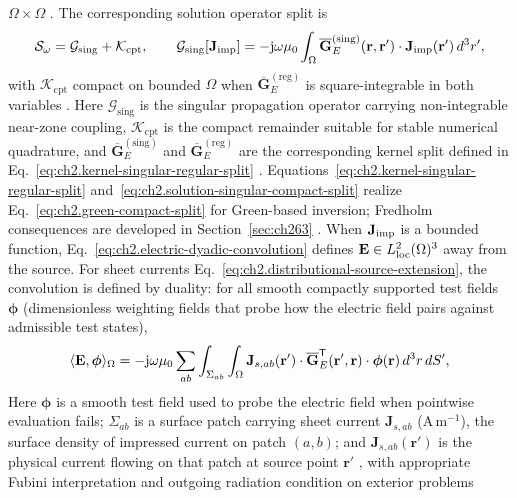 \(\Omega\times\Omega\) \cite{stratton1941}. The corresponding
solution operator split is
\begin{equation}
\label{eq:ch2.solution-singular-compact-split}
\mathcal{S}_\omega
=
\mathcal{G}_{\mathrm{sing}}+\mathcal{K}_{\mathrm{cpt}},
\qquad
\mathcal{G}_{\mathrm{sing}}[\mathbf{J}_{\mathrm{imp}}]
=
-\mathrm{j}\omega\mu_0\int_{\Omega}
\overline{\mathbf{G}}_{E}^{\mathrm{(sing)}}(\mathbf{r},\mathbf{r}')\cdot\mathbf{J}_{\mathrm{imp}}(\mathbf{r}')\,d^{3}r',
\end{equation}
with \(\mathcal{K}_{\mathrm{cpt}}\) compact on bounded \(\Omega\) when
\(\overline{\mathbf{G}}_{E}^{\mathrm{(reg)}}\) is square-integrable in both variables
\cite{stratton1941}. Here $\mathcal{G}_{\mathrm{sing}}$ is the singular propagation
operator carrying non-integrable near-zone coupling, $\mathcal{K}_{\mathrm{cpt}}$ is the
compact remainder suitable for stable numerical quadrature, and
$\overline{\mathbf{G}}_{E}^{\mathrm{(sing)}}$ and $\overline{\mathbf{G}}_{E}^{\mathrm{(reg)}}$
are the corresponding kernel split defined in Eq.~\eqref{eq:ch2.kernel-singular-regular-split}
\cite{harrington2001}. Equations~\eqref{eq:ch2.kernel-singular-regular-split}
and~\eqref{eq:ch2.solution-singular-compact-split} realize
Eq.~\eqref{eq:ch2.green-compact-split} for Green-based inversion; Fredholm consequences
are developed in Section~\ref{sec:ch263} \cite{harrington2001}.
When \(\mathbf{J}_{\mathrm{imp}}\) is a bounded function, Eq.~\eqref{eq:ch2.electric-dyadic-convolution}
defines \(\mathbf{E}\in L^{2}_{\mathrm{loc}}(\Omega)^{3}\) away from the source. For sheet
currents Eq.~\eqref{eq:ch2.distributional-source-extension}, the convolution is defined
by duality: for all smooth compactly supported test fields \(\boldsymbol{\phi}\) (dimensionless
weighting fields that probe how the electric field pairs against admissible test states),
\begin{equation}
\label{eq:ch2.distributional-dyadic-pairing}
\langle\mathbf{E},\boldsymbol{\phi}\rangle_{\Omega}
=
-\mathrm{j}\omega\mu_0
\sum_{ab}\int_{\Sigma_{ab}}\int_{\Omega}
\mathbf{J}_{s,ab}(\mathbf{r}')
\cdot\overline{\mathbf{G}}_{E}^{\mathsf{T}}(\mathbf{r}',\mathbf{r})\cdot\boldsymbol{\phi}(\mathbf{r})\,d^{3}r\,dS',
\end{equation}
Here $\boldsymbol{\phi}$ is a smooth test field used to probe the electric field when
pointwise evaluation fails; $\Sigma_{ab}$ is a surface patch carrying sheet current
$\mathbf{J}_{s,ab}$ (A\,m\(^{-1}\)), the surface density of impressed current on patch
$(a,b)$; and $\mathbf{J}_{s,ab}(\mathbf{r}')$ is the physical current flowing on that
patch at source point $\mathbf{r}'$ \cite{stratton1941}, with appropriate Fubini interpretation and outgoing radiation condition on exterior problems
